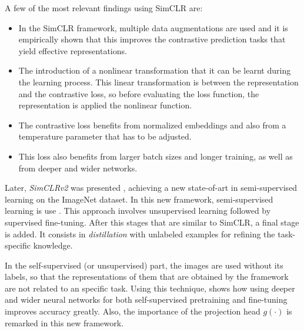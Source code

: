     
    A few of the most relevant findings using SimCLR are: 
    \begin{itemize}
    \item In the SimCLR framework, multiple data augmentations are used and it is empirically shown that this improves the contrastive prediction tasks that yield effective representations.
    
    \item The introduction of a nonlinear transformation that it can be learnt during the learning process. This linear transformation is between the representation and the contrastive loss, so before evaluating the loss function, the representation is applied the nonlinear function.
    
    \item The contrastive loss benefits from normalized embeddings and also from a temperature parameter that has to be adjusted.
    
    \item This loss also benefits from larger batch sizes and longer training, as well as from deeper and wider networks.
\end{itemize}

Later, \emph{SimCLRv2} was presented \citep{chen2020big}, achieving a new state-of-art in semi-supervised learning on the ImageNet dataset. In this new framework, semi-supervised learning is use . This approach involves unsupervised learning followed by supervised fine-tuning\footnotemark. After this stages that are similar to SimCLR,  a final stage is added. It consists in \emph{distillation} with unlabeled examples for refining the task-specific knowledge.


In the self-supervised (or unsupervised) part, the images are used without its labels, so that the representations of them that are obtained by the framework are not related to an specific task. Using this technique, \cite{chen2020big} shows how using deeper and wider neural networks for both self-supervised pretraining and fine-tuning improves accuracy greatly. Also, the importance of the projection head $g(\cdot)$ is remarked in this new framework.
